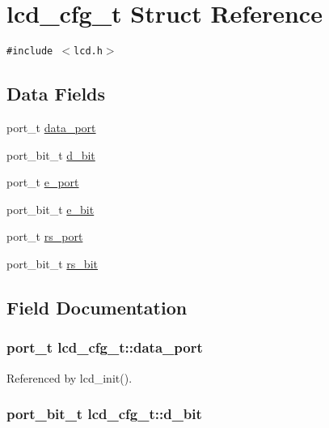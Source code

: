 \hypertarget{structlcd__cfg__t}{
\section{lcd\_\-cfg\_\-t Struct Reference}
\label{structlcd__cfg__t}
}
{\tt \#include $<$lcd.h$>$}

\subsection*{Data Fields}
\begin{CompactItemize}
\item 
port\_\-t \hyperlink{structlcd__cfg__t_38ff803795560a7967c9918293d4e7df}{data\_\-port}
\item 
port\_\-bit\_\-t \hyperlink{structlcd__cfg__t_299bdce69aaa3d6f7c224fd7cb4fddfc}{d\_\-bit}
\item 
port\_\-t \hyperlink{structlcd__cfg__t_77a1c9d62a0406805a4496e9b9f7badb}{e\_\-port}
\item 
port\_\-bit\_\-t \hyperlink{structlcd__cfg__t_8fc21664b25bd462f7524276cef55911}{e\_\-bit}
\item 
port\_\-t \hyperlink{structlcd__cfg__t_5c24fb95552caef42e1babc3cec17ba6}{rs\_\-port}
\item 
port\_\-bit\_\-t \hyperlink{structlcd__cfg__t_e4f781d2a465b21d8bab29a6b99c1ed8}{rs\_\-bit}
\end{CompactItemize}


\subsection{Field Documentation}
\hypertarget{structlcd__cfg__t_38ff803795560a7967c9918293d4e7df}{
\subsubsection{\setlength{\rightskip}{0pt plus 5cm}port\_\-t {\bf lcd\_\-cfg\_\-t::data\_\-port}}}
\label{structlcd__cfg__t_38ff803795560a7967c9918293d4e7df}




Referenced by lcd\_\-init().\hypertarget{structlcd__cfg__t_299bdce69aaa3d6f7c224fd7cb4fddfc}{
\subsubsection{\setlength{\rightskip}{0pt plus 5cm}port\_\-bit\_\-t {\bf lcd\_\-cfg\_\-t::d\_\-bit}}}
\label{structlcd__cfg__t_299bdce69aaa3d6f7c224fd7cb4fddfc}




